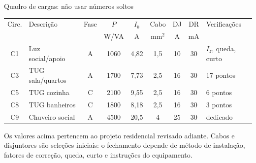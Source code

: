 \begin{frame}{Quadro de cargas: não usar números soltos}
\scriptsize
\begin{tabularx}{\textwidth}{c p{2.25cm} c c c c c c X}
\toprule
Circ. & Descrição & Fase & $P$ & $I_b$ & Cabo & DJ & DR & Verificações \\
 & & & W/VA & A & mm$^2$ & A & mA & \\
\midrule
C1 & Luz social/apoio & A & 1060 & 4,82 & 1,5 & 10 & 30 & $I_z$, queda, curto \\
C3 & TUG sala/quartos & A & 1700 & 7,73 & 2,5 & 16 & 30 & 17 pontos \\
C5 & TUG cozinha & C & 2100 & 9,55 & 2,5 & 16 & 30 & 6 pontos \\
C8 & TUG banheiros & C & 1800 & 8,18 & 2,5 & 16 & 30 & 3 pontos \\
C9 & Chuveiro social & A & 4500 & 20,5 & 4 & 25 & 30 & dedicado \\
\bottomrule
\end{tabularx}
\vspace{2mm}
\begin{caixaAt}
Os valores acima pertencem ao projeto residencial revisado adiante. Cabos e disjuntores são seleções iniciais: o fechamento depende de método de instalação, fatores de correção, queda, curto e instruções do equipamento.
\end{caixaAt}
\end{frame}

